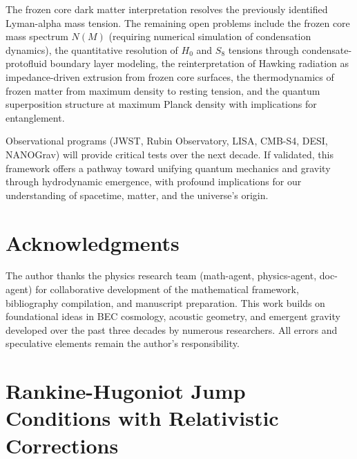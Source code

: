 \documentclass[11pt,a4paper]{article}
\theoremstyle{definition}
\theoremstyle{remark}
\begin{document}
The frozen core dark matter interpretation resolves the previously identified Lyman-alpha mass tension. The remaining open problems include the frozen core mass spectrum $N(M)$ (requiring numerical simulation of condensation dynamics), the quantitative resolution of $H_0$ and $S_8$ tensions through condensate-protofluid boundary layer modeling, the reinterpretation of Hawking radiation as impedance-driven extrusion from frozen core surfaces, the thermodynamics of frozen matter from maximum density to resting tension, and the quantum superposition structure at maximum Planck density with implications for entanglement.

Observational programs (JWST, Rubin Observatory, LISA, CMB-S4, DESI, NANOGrav) will provide critical tests over the next decade. If validated, this framework offers a pathway toward unifying quantum mechanics and gravity through hydrodynamic emergence, with profound implications for our understanding of spacetime, matter, and the universe's origin.

\section*{Acknowledgments}

The author thanks the physics research team (math-agent, physics-agent, doc-agent) for collaborative development of the mathematical framework, bibliography compilation, and manuscript preparation. This work builds on foundational ideas in BEC cosmology, acoustic geometry, and emergent gravity developed over the past three decades by numerous researchers. All errors and speculative elements remain the author's responsibility.

\appendix

\section{Rankine-Hugoniot Jump Conditions with Relativistic Corrections}
\label{app:rankine_hugoniot}
\end{document}
